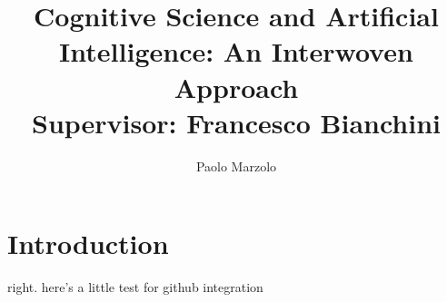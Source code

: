 \documentclass{article}
\title{Cognitive Science and Artificial Intelligence: An Interwoven Approach \\
\large Supervisor: Francesco Bianchini}
\author{Paolo Marzolo}
\begin{document}
\maketitle
\newpage

\section{Introduction}
right. here's a little test for github integration


\end{document}
